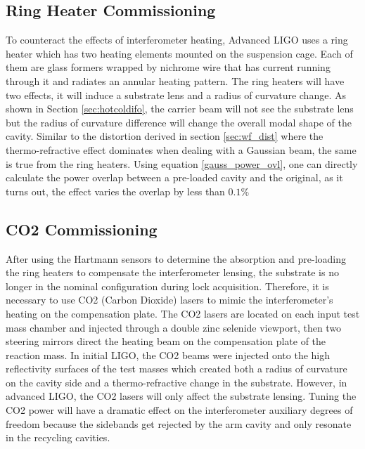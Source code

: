 	
	
	\subsection{Ring Heater Commissioning}\label{Sec:RH}
	To counteract the effects of interferometer heating, Advanced LIGO uses a ring heater \cite{ramette_analytical} \cite{wang_thermalmodel} which has two heating elements mounted on the suspension cage. Each of them are glass formers wrapped by nichrome wire that has current running through it and radiates an annular heating pattern. The ring heaters will have two effects, it will induce a substrate lens and a radius of curvature change.  As shown in Section \ref{sec:hotcoldifo}, the carrier beam will not see the substrate lens but the radius of curvature difference will change the overall modal shape of the cavity.  Similar to the distortion derived in section \ref{sec:wf_dist} where the thermo-refractive effect dominates when dealing with a Gaussian beam, the same is true from the ring heaters. Using equation \ref{gauss_power_ovl}, one can directly calculate the power overlap between a pre-loaded cavity and the original, as it turns out, the effect varies the overlap by less than $0.1\%$

	\subsection{CO2 Commissioning}\label{Sec:CO2}
	After using the Hartmann sensors to determine the absorption and pre-loading the ring heaters to compensate the interferometer lensing, the substrate is no longer in the nominal configuration during lock acquisition.  Therefore, it is necessary to use CO2 (Carbon Dioxide) lasers to mimic the interferometer's heating on the compensation plate.  The CO2 lasers are located on each input test mass chamber and injected through a double zinc selenide viewport, then two steering mirrors direct the heating beam on the compensation plate of the reaction mass.  In initial LIGO, the CO2 beams were injected onto the high reflectivity surfaces of the test masses which created both a radius of curvature on the cavity side and a thermo-refractive change in the substrate.  However, in advanced LIGO, the CO2 lasers will only affect the substrate lensing.  Tuning the CO2 power will have a dramatic effect on the interferometer auxiliary degrees of freedom because the sidebands get rejected by the arm cavity and only resonate in the recycling cavities.
	
